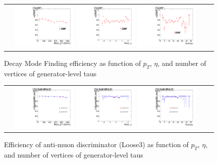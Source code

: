 \begin{figure}[tbh!]
    \centering
    \begin{tabular}{cc}
      \includegraphics[width=0.30\textwidth]{DMF_4_29_16.pdf}
      \includegraphics[width=0.30\textwidth]{DMF_eta_4_29_16.pdf}
       \includegraphics[width=0.30\textwidth]{DMF_nvtx_4_29_16.pdf}
    \end{tabular}
    \caption{Decay Mode Finding efficiency as function of $p_{T}$, $\eta$, and number of vertices of generator-level taus }
    \label{fig:DMF}
  \end{figure}
 
\begin{figure}[tbh!]
    \centering
    \begin{tabular}{cc}
      \includegraphics[width=0.30\textwidth]{AgainstMuon_4_29_16.pdf}
      \includegraphics[width=0.30\textwidth]{AgainstMuon_eta_4_29_16.pdf}
       \includegraphics[width=0.30\textwidth]{AgainstMuon_nvtx_4_29_16.pdf}
    \end{tabular}
    \caption{Efficiency of anti-muon discriminator (Loose3) as function of $p_{T}$, $\eta$, and number of vertices of generator-level taus }
    \label{fig:ML3}
  \end{figure}


